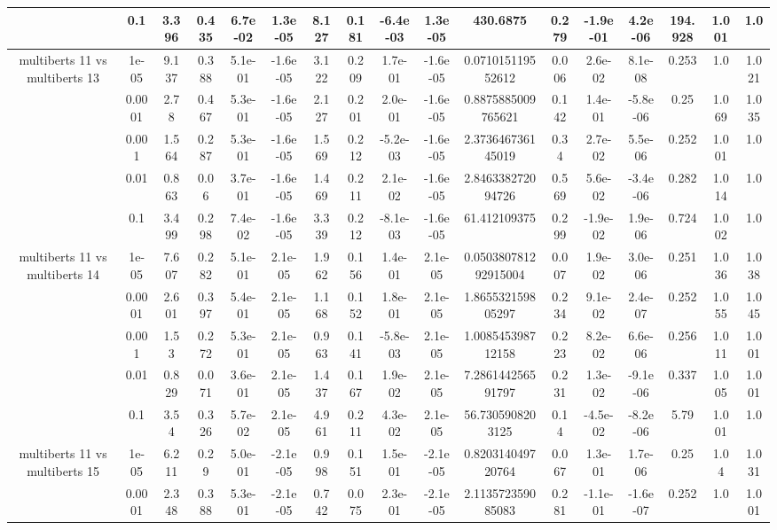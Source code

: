 \begin{tabular}{|c|c|c|c|c|c|c|c|c|c|c|c|c|c|c|c|c|}
 & 0.1 & 3.396 & 0.435 & 6.7e-02 & 1.3e-05 & 8.127 & 0.181 & -6.4e-03 & 1.3e-05 & 430.6875 & 0.279 & -1.9e-01 & 4.2e-06 & 194.928 & 1.001 & 1.0 \\
\hline
\multirow{5}{*}{multiberts 11 vs multiberts 13} & 1e-05 & 9.137 & 0.388 & 5.1e-01 & -1.6e-05 & 3.122 & 0.209 & 1.7e-01 & -1.6e-05 & 0.071015119552612 & 0.006 & 2.6e-02 & 8.1e-08 & 0.253 & 1.0 & 1.021 \\
 & 0.0001 & 2.78 & 0.467 & 5.3e-01 & -1.6e-05 & 2.127 & 0.201 & 2.0e-01 & -1.6e-05 & 0.8875885009765621 & 0.142 & 1.4e-01 & -5.8e-06 & 0.25 & 1.069 & 1.035 \\
 & 0.001 & 1.564 & 0.287 & 5.3e-01 & -1.6e-05 & 1.569 & 0.212 & -5.2e-03 & -1.6e-05 & 2.373646736145019 & 0.34 & 2.7e-02 & 5.5e-06 & 0.252 & 1.001 & 1.0 \\
 & 0.01 & 0.863 & 0.06 & 3.7e-01 & -1.6e-05 & 1.469 & 0.211 & 2.1e-02 & -1.6e-05 & 2.846338272094726 & 0.569 & 5.6e-02 & -3.4e-06 & 0.282 & 1.014 & 1.0 \\
 & 0.1 & 3.499 & 0.298 & 7.4e-02 & -1.6e-05 & 3.339 & 0.212 & -8.1e-03 & -1.6e-05 & 61.412109375 & 0.299 & -1.9e-02 & 1.9e-06 & 0.724 & 1.002 & 1.0 \\
\hline
\multirow{5}{*}{multiberts 11 vs multiberts 14} & 1e-05 & 7.607 & 0.282 & 5.1e-01 & 2.1e-05 & 1.962 & 0.156 & 1.4e-01 & 2.1e-05 & 0.050380781292915004 & 0.007 & 1.9e-02 & 3.0e-06 & 0.251 & 1.036 & 1.038 \\
 & 0.0001 & 2.601 & 0.397 & 5.4e-01 & 2.1e-05 & 1.168 & 0.152 & 1.8e-01 & 2.1e-05 & 1.865532159805297 & 0.234 & 9.1e-02 & 2.4e-07 & 0.252 & 1.055 & 1.045 \\
 & 0.001 & 1.53 & 0.272 & 5.3e-01 & 2.1e-05 & 0.963 & 0.141 & -5.8e-03 & 2.1e-05 & 1.008545398712158 & 0.223 & 8.2e-02 & 6.6e-06 & 0.256 & 1.011 & 1.001 \\
 & 0.01 & 0.829 & 0.071 & 3.6e-01 & 2.1e-05 & 1.437 & 0.167 & 1.9e-02 & 2.1e-05 & 7.286144256591797 & 0.231 & 1.3e-02 & -9.1e-06 & 0.337 & 1.005 & 1.001 \\
 & 0.1 & 3.54 & 0.326 & 5.7e-02 & 2.1e-05 & 4.961 & 0.211 & 4.3e-02 & 2.1e-05 & 56.7305908203125 & 0.14 & -4.5e-02 & -8.2e-06 & 5.79 & 1.001 & 1.0 \\
\hline
\multirow{5}{*}{multiberts 11 vs multiberts 15} & 1e-05 & 6.211 & 0.29 & 5.0e-01 & -2.1e-05 & 0.998 & 0.151 & 1.5e-01 & -2.1e-05 & 0.820314049720764 & 0.067 & 1.3e-01 & 1.7e-06 & 0.25 & 1.04 & 1.031 \\
 & 0.0001 & 2.348 & 0.388 & 5.3e-01 & -2.1e-05 & 0.742 & 0.075 & 2.3e-01 & -2.1e-05 & 2.113572359085083 & 0.281 & -1.1e-01 & -1.6e-07 & 0.252 & 1.0 & 1.001 \\

\end{tabular}
